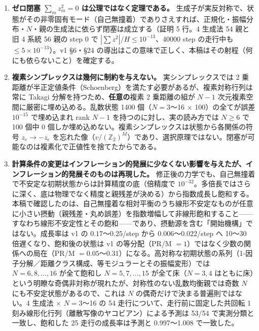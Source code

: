 \documentclass[
  10pt,
  a4paper,
]{ltjsarticle}
\providecommand{\tightlist}{%
  \setlength{\itemsep}{0pt}\setlength{\parskip}{0pt}}
\begin{document}
\begin{enumerate}
\def\labelenumi{\arabic{enumi}.}
\tightlist
\item
  \textbf{ゼロ閉塞 \(\sum_m z_m^2=0\) は公理ではなく定理である。}
  生成子が実反対称で、状態がその非零固有モード（自己無撞着）でありさえすれば、正規化・振幅分布・\(N\)・親の生成法に依らず閉塞は成立する（証明
  5 行。4 生成法 54 親と旧 4 系統 56 親の step 0 で
  \(|\sum z^2|/H\le 10^{-13}\)、40000 step の走行中も
  \(\le 5\times10^{-13}\)）。v1 §6・§24
  の導出はこの意味で正しく、本稿はその射程（何にも依らないこと）を確定する。
\item
  \textbf{複素シンプレックスは幾何に制約を与えない。}
  実シンプレックスでは 2
  乗距離が半正定値条件（Schoenberg）を満たす必要があるが、複素対称行列は常に
  Takagi 分解を持つため、\textbf{任意の}複素 2 乗距離の組が \(N-1\)
  次元複素空間に厳密に埋め込める。乱数状態 1400 個（\(N=3\)〜16 ×
  100）の全てが誤差 \(10^{-15}\) で埋め込まれ rank \(N-1\)
  を持つのに対し、実の読み方では \(N\ge6\) で 100 個中 0
  個しか埋め込めない。複素シンプレックスは状態から各関係の符号
  \(z_e\to-z_e\)
  を忘れた像（\(v/(\mathbb Z_2)^M\)）であり、選択原理ではない。閉塞が可能なのは複素化で正値性を捨てたからである。
\item
  \textbf{計算条件の変更はインフレーション的発展に少なくない影響を与えたが、インフレーション的発展そのものは再現した。}
  修正後の力学でも、自己無撞着で不安定な初期状態からは計算精度の底（倍精度で
  \(10^{-32}\)。多倍長ではさらに深く、底は物理でなく精度と親残差が決める）から指数成長し飽和する。本稿で確認したのは、自己無撞着な相対平衡のうち線形不安定なものが任意に小さい摂動（親残差・丸め誤差）を指数増幅して非線形飽和すること------すなわち線形不安定性とその飽和------であり、摂動源を含む「開始機構」ではない。成長率は
  v1 の \(0.17\)〜\(0.25\)/step から \(0.006\)〜\(0.022\)/step へ 10〜30
  倍遅くなり、飽和後の状態は v1 の等分配（PR/M
  \(=1\)）ではなく少数の関係への局在（PR/M
  \(=0.05\)〜0.31）になる。高対称な初期状態の系列（1-因子分解／距離クラス構成、等モジュラーとその振幅変形）では
  \(N=6,8,\dots,16\) が全て飽和し \(N=5,7,\dots,15\) が全て床（\(N=3,4\)
  はともに床）という明瞭な奇偶非対称が現れたが、対称性のない乱数均衡親では奇数
  \(N\) にも不安定状態があるので、これは \(N\)
  の偶奇だけで決まる普遍則ではない。4 生成法 × \(N=3\)〜16 の 54
  走行について、走行前に固定した共回転 1
  刻み線形化行列（離散写像のヤコビアン）による予測は 53/54
  で実測分類と一致し、飽和した 25 走行の成長率は予測と 0.997〜1.008
  で一致した。
\end{enumerate}
\end{document}
